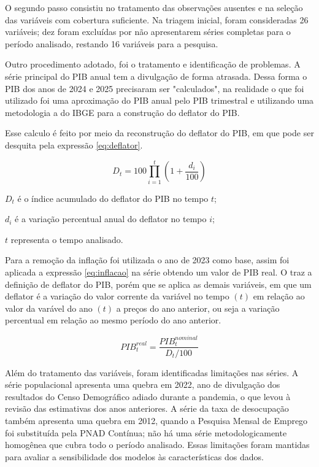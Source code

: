 O segundo passo consistiu no tratamento das observações ausentes e na seleção das variáveis com cobertura suficiente. Na triagem inicial, foram consideradas 26 variáveis; dez foram excluídas por não apresentarem séries completas para o período analisado, restando 16 variáveis para a pesquisa.

Outro procedimento adotado, foi o tratamento e identificação de problemas. A série principal do PIB anual tem a divulgação de forma atrasada. Dessa forma o PIB dos anos de 2024 e 2025 precisaram ser "calculados", na realidade o que foi utilizado foi uma aproximação do PIB anual pelo PIB trimestral e utilizando uma metodologia a do IBGE para a construção do deflator do PIB.

Esse calculo é feito por meio da reconstrução do deflator do PIB, em que pode ser desquita pela expressão \ref{eq:deflator}.

\begin{equation}
	\label{eq:deflator}
	D_t = 100 \prod_{i=1}^{t}
	\left(1+\frac{d_i}{100}\right)
\end{equation}


\(D_t\) é o índice acumulado do deflator do PIB no tempo \(t\);

\(d_i\) é a variação percentual anual do deflator no tempo \(i\);

\(t\) representa o tempo analisado.

Para a remoção da inflação foi utilizada o ano de 2023 como base, assim foi aplicada a expressão \ref{eq:inflacao} na série obtendo um valor de PIB real. O  traz a definição de deflator do PIB, porém que se aplica as demais variáveis, em que um deflator é a variação do valor corrente da variável no tempo $(t)$ em relação ao valor da varável do ano $(t)$ a preços do ano anterior, ou seja a variação percentual em relação ao mesmo período do ano anterior.

\begin{equation}
	\label{eq:inflacao}
	PIB_t^{real} =
	\frac{PIB_t^{nominal}}{D_t/100}
\end{equation}

Além do tratamento das variáveis, foram identificadas limitações nas séries. A série populacional apresenta uma quebra em 2022, ano de divulgação dos resultados do Censo Demográfico adiado durante a pandemia, o que levou à revisão das estimativas dos anos anteriores. A série da taxa de desocupação também apresenta uma quebra em 2012, quando a Pesquisa Mensal de Emprego foi substituída pela PNAD Contínua; não há uma série metodologicamente homogênea que cubra todo o período analisado. Essas limitações foram mantidas para avaliar a sensibilidade dos modelos às características dos dados.

